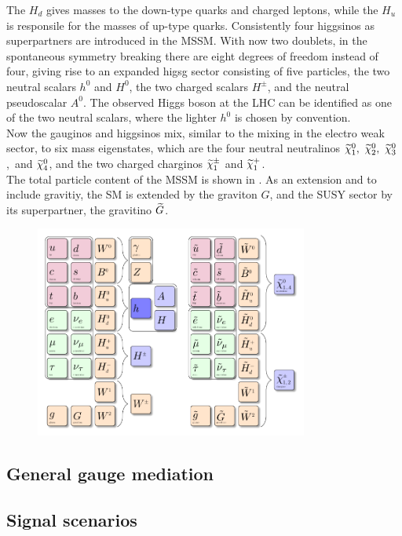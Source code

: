The $H_d$ gives masses to the down-type quarks and charged leptons, while the $H_u$ is responsile for the masses of up-type quarks. Consistently four higgsinos as superpartners are introduced in the MSSM. With now two doublets, in the spontaneous symmetry breaking there are eight degrees of freedom instead of four, giving rise to an expanded higsg sector consisting of five particles, the two neutral scalars $h^0$ and $H^0$, the two charged scalars $H^{\pm}$, and the neutral pseudoscalar $A^0$. The observed Higgs boson at the LHC can be identified as one of the two neutral scalars, where the lighter $h^0$ is chosen by convention.\\
Now the gauginos and higgsinos mix, similar to the mixing in the electro weak sector, to six mass eigenstates, which are the four neutral neutralinos $\widetilde{\chi}^{0}_{1},~\widetilde{\chi}^{0}_{2},~\widetilde{\chi}^{0}_{3}$,~and $\widetilde{\chi}^{0}_{4}$, and the two charged charginos $\widetilde{\chi}^\pm_{1}$ and $\widetilde{\chi}^{+}_{1}$.\\
The total particle content of the MSSM is shown in . As an extension and to include gravitiy, the SM is extended by the graviton $G$, and the SUSY sector by its superpartner, the gravitino $\widetilde{G}$.

\begin{figure}[!htpb]
\centering
  \includegraphics[width=0.8\textwidth]{figures/general/MSSM}
  \caption{}
  \label{fig:mssm}

\end{figure}




\subsection{General gauge mediation}\label{sec:GGM}

\subsection{Signal scenarios}\label{sec:SMS}
